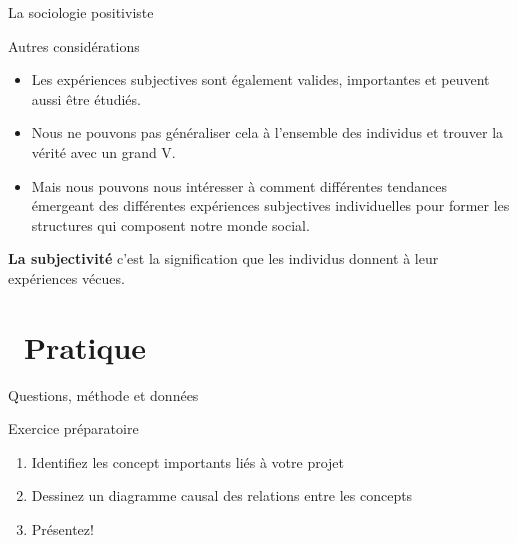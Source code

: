 \documentclass[10pt]{beamer}
\begin{document}
\begin{frame}{La sociologie positiviste}
    \begin{block}{Autres considérations}
    \end{block}
    \begin{itemize}
        \item Les expériences subjectives sont également valides, importantes et peuvent aussi être étudiés.
        \item Nous ne pouvons pas généraliser cela à l'ensemble des individus et trouver la vérité avec un grand V.
        \item Mais nous pouvons nous intéresser à comment différentes tendances émergeant des différentes expériences subjectives individuelles pour former les structures qui composent notre monde social.
    \end{itemize}
\textbf{La subjectivité} c'est la signification que les individus donnent à leur expériences vécues.
\end{frame}


\section{\faFlask~Pratique}

\begin{frame}{Questions, méthode et données}
    \begin{block}{Exercice préparatoire}
    \begin{enumerate}[<+->]
        \item[\faBrain] Identifiez les concept importants liés à votre projet
        \item[\faProjectDiagram] Dessinez un diagramme causal des relations entre les concepts
        \item[\faChalkboardTeacher] Présentez!
    \end{enumerate}
    \end{block}
\end{frame}
\end{document}
